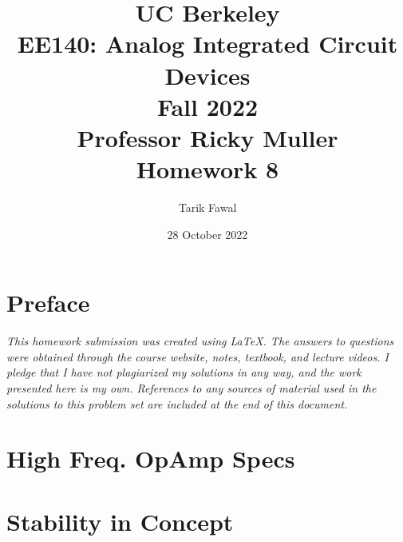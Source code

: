 \documentclass[12pt, fleqn]{article}
\title {
    \normalsize{UC Berkeley}\\
    \large{{EE140: Analog Integrated Circuit Devices\\Fall 2022\\Professor Ricky Muller\\}}
    \vspace{0.5ex}
    \Huge{Homework 8}
    \vspace{0.5ex}
}
\author{Tarik Fawal}
\date{28 October 2022}
\begin{document}
\maketitle
\tableofcontents
\flushbottom
    \section*{Preface}
        \textit{\emph{This homework submission was created using \LaTeX.  The answers to questions were obtained through the course website, notes, textbook, and lecture videos.  I pledge that I have not plagiarized my solutions in any way, and the work presented here is my own.  References to any sources of material used in the solutions to this problem set are included at the end of this document.}}
\section{High Freq. OpAmp Specs}

\section{Stability in Concept}

\end{document}
